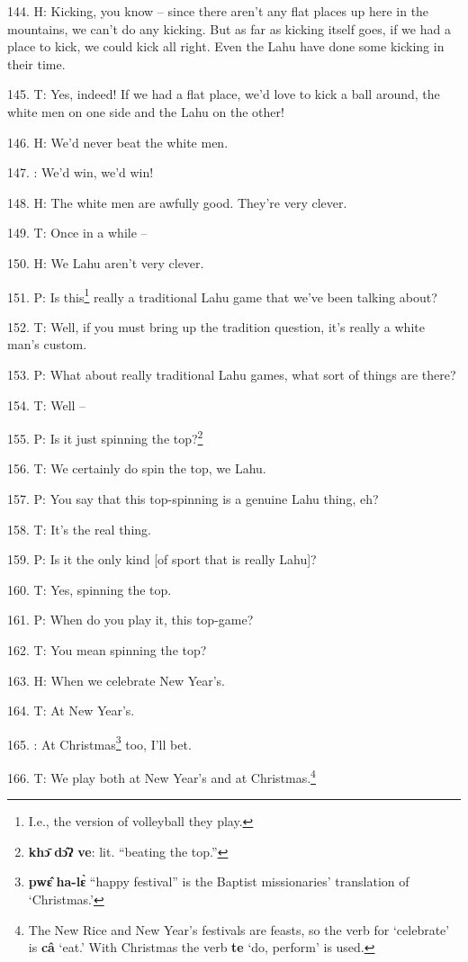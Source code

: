 144. H: Kicking, you know -- since there aren't any flat places up here in the mountains,
we can't do any kicking. But as far as kicking itself goes, if we had a place to
kick, we could kick all right. Even the Lahu have done some kicking in their time.

145. T: Yes, indeed! If we had a flat place, we'd love to kick a ball around, the
white men on one side and the Lahu on the other!

146. H: We'd never beat the white men.

147. : We'd win, we'd win!

148. H: The white men are awfully good. They're very clever.

149. T: Once in a while --

150. H: We Lahu aren't very clever.

151. P: Is this\footnote{I.e., the version of volleyball they play.} really a traditional Lahu game that we've been talking about?

152. T: Well, if you must bring up the tradition question, it's really a white man's
custom.

153. P: What about really traditional Lahu games, what sort of things are there?

154. T: Well --

155. P: Is it just spinning the top?\footnote{\textbf{khɔ̄} \textbf{dɔ̂ʔ} \textbf{ve}: lit. ``beating the top.''}

156. T: We certainly do spin the top, we Lahu.

157. P: You say that this top-spinning is a genuine Lahu thing, eh?

158. T: It's the real thing.

159. P: Is it the only kind [of sport that is really Lahu]?

160. T: Yes, spinning the top.

161. P: When do you play it, this top-game?

162. T: You mean spinning the top?

163. H: When we celebrate New Year's.

164. T: At New Year's.

165. : At Christmas\footnote{\textbf{pwɛ̂} \textbf{ha-lɛ̀} ``happy festival'' is the Baptist missionaries' translation of `Christmas.'} too, I'll bet.

166. T: We play both at New Year's and at Christmas.\footnote{The New Rice and New Year's festivals are feasts, so the verb for `celebrate' is \textbf{câ} `eat.' With Christmas the verb \textbf{te} `do, perform' is used.}

